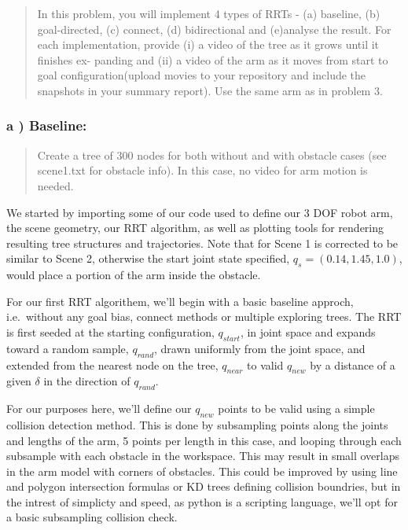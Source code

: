 \documentclass{article}
\begin{document}
    \begin{quote}
In this problem, you will implement 4 types of RRTs - (a) baseline, (b)
goal-directed, (c) connect, (d) bidirectional and (e)analyse the result.
For each implementation, provide (i) a video of the tree as it grows
until it finishes ex- panding and (ii) a video of the arm as it moves
from start to goal configuration(upload movies to your repository and
include the snapshots in your summary report). Use the same arm as in
problem 3.
\end{quote}


    \subsubsection{a ) Baseline:}


    \begin{quote}
Create a tree of 300 nodes for both without and with obstacle cases (see
scene1.txt for obstacle info). In this case, no video for arm motion is
needed.
\end{quote}

    We started by importing some of our code used to define our 3 DOF robot
arm, the scene geometry, our RRT algorithm, as well as plotting tools
for rendering resulting tree structures and trajectories. Note that for
Scene 1 is corrected to be similar to Scene 2, otherwise the start joint
state specified, $q_s = (0.14, 1.45, 1.0)$, would place a portion of the
arm inside the obstacle.


    For our first RRT algorithem, we'll begin with a basic baseline approch,
i.e.~without any goal bias, connect methods or multiple exploring trees.
The RRT is first seeded at the starting configuration, $q_{start}$, in
joint space and expands toward a random sample, $q_{rand}$, drawn
uniformly from the joint space, and extended from the nearest node on
the tree, $q_{near}$ to valid $q_{new}$ by a distance of a given
$\delta$ in the direction of $q_{rand}$.

For our purposes here, we'll define our $q_{new}$ points to be valid
using a simple collision detection method. This is done by subsampling
points along the joints and lengths of the arm, 5 points per length in
this case, and looping through each subsample with each obstacle in the
workspace. This may result in small overlaps in the arm model with
corners of obstacles. This could be improved by using line and polygon
intersection formulas or KD trees defining collision boundries, but in
the intrest of simplicty and speed, as python is a scripting language,
we'll opt for a basic subsampling collision check.
\end{document}
